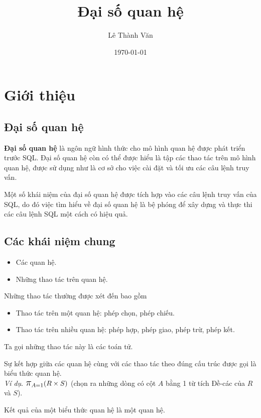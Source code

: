\documentclass[11pt]{beamer}
\title{Đại số quan hệ}
\institute{Khoa Hệ thống thông tin quản lý}
\author{Lê Thành Văn}
\date{\today}
\newcommand{\mmm}[1]{\mathlarger{\mathlarger{\mathlarger#1}}}%
\newcommand{\ppi}[2]{\mmm{\pi}_{#1}(#2)}%
\begin{document}
  \begin{frame}
    \titlepage
  \end{frame}
  \section{Giới thiệu}
  \subsection{Đại số quan hệ}
  \begin{frame}
    \textbf{Đại số quan hệ} là ngôn ngữ hình thức cho mô hình quan hệ được phát triển trước SQL. 
    Đại số quan hệ còn có thể được hiểu là tập các thao tác trên mô hình quan hệ, được sử dụng như là cơ sở cho việc cài đặt và tối ưu các câu lệnh truy vấn.
  \end{frame}
  \begin{frame}
    Một số khái niệm của đại số quan hệ được tích hợp vào các câu lệnh truy vấn của SQL, 
    do đó việc tìm hiểu về đại số quan hệ là bệ phóng để xây dựng và thực thi các câu lệnh SQL một cách có hiệu quả.
  \end{frame}
  \subsection{Các khái niệm chung}
  \begin{frame}
    \begin{itemize}
      \item<2-> Các quan hệ.
      \item<3-> Những thao tác trên quan hệ.
    \end{itemize}  
  \end{frame}
  \begin{frame}
    Những thao tác thường được xét đến bao gồm
    \begin{itemize}
      \item Thao tác trên một quan hệ: phép chọn, phép chiếu.
      \item Thao tác trên nhiều quan hệ: phép hợp, phép giao, phép trừ, phép kết.
    \end{itemize}
    Ta gọi những thao tác này là các toán tử.
  \end{frame}
  \begin{frame}
    Sự kết hợp giữa các quan hệ cùng với các thao tác theo đúng cấu trúc được gọi là biểu thức quan hệ. \\
    \textit{Ví dụ}. $\ppi{A = 1}{R \times S}$ (chọn ra những dòng có cột $A$ bằng 1 từ 
    tích Đề-các của $R$ và $S$).
  \end{frame}
  \begin{frame}
    Kết quả của một biểu thức quan hệ là một quan hệ.
  \end{frame}
\end{document}
